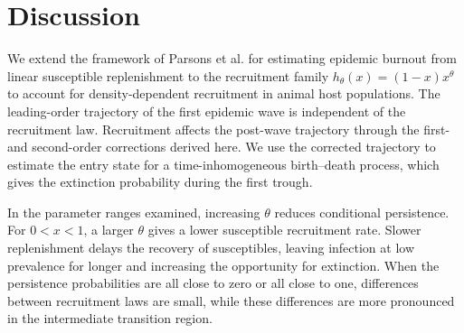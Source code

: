 \documentclass[11pt]{article}
\newcommand{\Rzero}{\mathcal R_0}
\newcommand{\rhoeps}{\rho}
\newcommand{\hth}{h_\theta}
\begin{document}
%

\section{Discussion}
\label{sec:discussion}
We extend the framework of Parsons et al. for estimating epidemic burnout from linear susceptible replenishment to the recruitment family \(\hth(x)=(1-x)x^\theta\) to account for density-dependent recruitment in animal host populations. The leading-order trajectory of the first epidemic wave is independent of the recruitment law. Recruitment affects the post-wave trajectory through the first- and second-order corrections derived here. We use the corrected trajectory to estimate the entry state for a time-inhomogeneous birth--death process, which gives the extinction probability during the first trough.

In the parameter ranges examined, increasing \(\theta\) reduces conditional persistence. For \(0<x<1\), a larger \(\theta\) gives a lower susceptible recruitment rate. Slower replenishment delays the recovery of susceptibles, leaving infection at low prevalence for longer and increasing the opportunity for extinction. When the persistence probabilities are all close to zero or all close to one, differences between recruitment laws are small, while these differences are more pronounced in the intermediate transition region.
\end{document}
